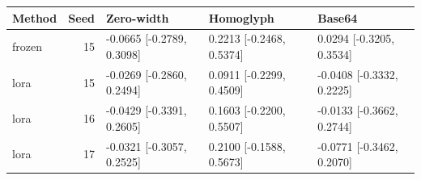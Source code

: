 \begin{tabular}{lrlll}
\toprule
Method & Seed & Zero-width & Homoglyph & Base64\\\midrule
frozen & 15 & -0.0665 [-0.2789, 0.3098] & 0.2213 [-0.2468, 0.5374] & 0.0294 [-0.3205, 0.3534]\\
lora & 15 & -0.0269 [-0.2860, 0.2494] & 0.0911 [-0.2299, 0.4509] & -0.0408 [-0.3332, 0.2225]\\
lora & 16 & -0.0429 [-0.3391, 0.2605] & 0.1603 [-0.2200, 0.5507] & -0.0133 [-0.3662, 0.2744]\\
lora & 17 & -0.0321 [-0.3057, 0.2525] & 0.2100 [-0.1588, 0.5673] & -0.0771 [-0.3462, 0.2070]\\
\bottomrule\end{tabular}
